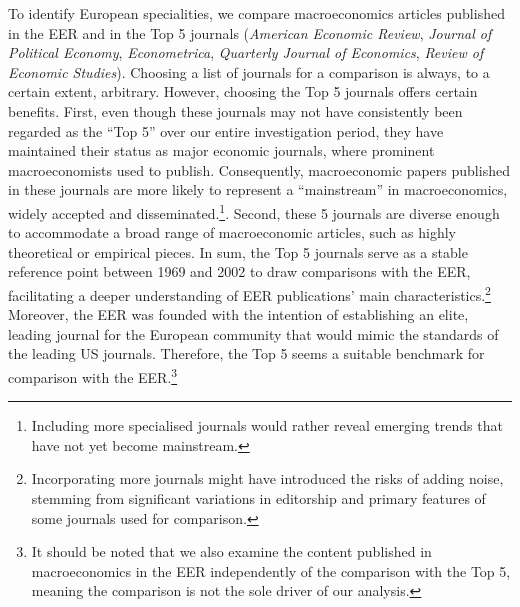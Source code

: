 \documentclass[
  12pt,
  onecolumn]{article}
\begin{document}
To identify European specialities, we compare macroeconomics articles
published in the EER and in the Top 5 journals (\emph{American Economic
Review}, \emph{Journal of Political Economy}, \emph{Econometrica},
\emph{Quarterly Journal of Economics}, \emph{Review of Economic
Studies}). Choosing a list of journals for a comparison is always, to a
certain extent, arbitrary. However, choosing the Top 5 journals offers
certain benefits. First, even though these journals may not have
consistently been regarded as the ``Top 5'' over our entire
investigation period, they have maintained their status as major
economic journals, where prominent macroeconomists used to publish.
Consequently, macroeconomic papers published in these journals are more
likely to represent a ``mainstream'' in macroeconomics, widely accepted
and disseminated.\footnote{Including more specialised journals would
  rather reveal emerging trends that have not yet become mainstream.}.
Second, these 5 journals are diverse enough to accommodate a broad range
of macroeconomic articles, such as highly theoretical or empirical
pieces. In sum, the Top 5 journals serve as a stable reference point
between 1969 and 2002 to draw comparisons with the EER, facilitating a
deeper understanding of EER publications' main
characteristics.\footnote{Incorporating more journals might have
  introduced the risks of adding noise, stemming from significant
  variations in editorship and primary features of some journals used
  for comparison.} Moreover, the EER was founded with the intention of
establishing an elite, leading journal for the European community that
would mimic the standards of the leading US journals. Therefore, the Top
5 seems a suitable benchmark for comparison with the EER.\footnote{It
  should be noted that we also examine the content published in
  macroeconomics in the EER independently of the comparison with the Top
  5, meaning the comparison is not the sole driver of our analysis.}
\end{document}

